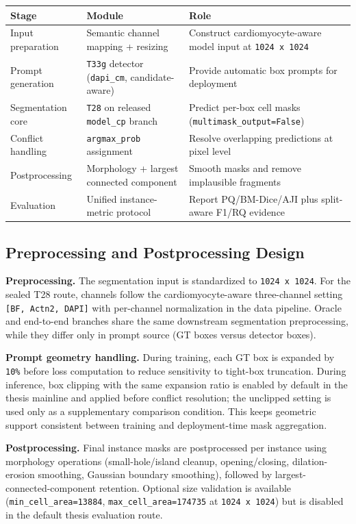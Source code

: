 {%
\begin{longtable}[]{@{}lll@{}}
\toprule\noalign{}
Stage & Module & Role \\
\midrule\noalign{}
\endhead
\bottomrule\noalign{}
\endlastfoot
Input preparation & Semantic channel mapping + resizing & Construct cardiomyocyte-aware model input at \texttt{1024\ x\ 1024} \\
Prompt generation & \texttt{T33g} detector (\texttt{dapi\_cm}, candidate-aware) & Provide automatic box prompts for deployment \\
Segmentation core & \texttt{T28} on released \texttt{model\_cp} branch & Predict per-box cell masks (\texttt{multimask\_output=False}) \\
Conflict handling & \texttt{argmax\_prob} assignment & Resolve overlapping predictions at pixel level \\
Postprocessing & Morphology + largest connected component & Smooth masks and remove implausible fragments \\
Evaluation & Unified instance-metric protocol & Report PQ/BM-Dice/AJI plus split-aware F1/RQ evidence \\
\end{longtable}
}

\subsection{Preprocessing and Postprocessing Design}\label{preprocessing-and-postprocessing-design}

\textbf{Preprocessing.}
The segmentation input is standardized to \texttt{1024\ x\ 1024}. For the sealed T28 route, channels follow the cardiomyocyte-aware three-channel setting \texttt{[BF,\ Actn2,\ DAPI]} with per-channel normalization in the data pipeline. Oracle and end-to-end branches share the same downstream segmentation preprocessing, while they differ only in prompt source (GT boxes versus detector boxes).

\textbf{Prompt geometry handling.}
During training, each GT box is expanded by \texttt{10\%} before loss computation to reduce sensitivity to tight-box truncation. During inference, box clipping with the same expansion ratio is enabled by default in the thesis mainline and applied before conflict resolution; the unclipped setting is used only as a supplementary comparison condition. This keeps geometric support consistent between training and deployment-time mask aggregation.

\textbf{Postprocessing.}
Final instance masks are postprocessed per instance using morphology operations (small-hole/island cleanup, opening/closing, dilation-erosion smoothing, Gaussian boundary smoothing), followed by largest-connected-component retention. Optional size validation is available (\texttt{min\_cell\_area=13884}, \texttt{max\_cell\_area=174735} at \texttt{1024\ x\ 1024}) but is disabled in the default thesis evaluation route.

